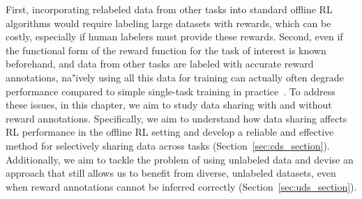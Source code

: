 \documentclass[../thesis.tex]{subfiles}
\begin{document}
First, incorporating relabeled data from other tasks into standard offline RL algorithms would require labeling large datasets with rewards, which can be costly, especially if human labelers must provide these rewards. Second, even if the functional form of the reward function for the task of interest is known beforehand, and data from other tasks are labeled with accurate reward annotations, na"{i}vely using all this data for training can actually often degrade performance compared to simple single-task training in practice~\citep{kalashnikov2021mt}. 
To address these issues, in this chapter, we aim to study data sharing with and without reward annotations. Specifically, we aim to understand how data sharing affects RL performance in the offline RL setting and develop a reliable and effective method for selectively sharing data across tasks (Section~\ref{sec:cds_section}). Additionally, we aim to tackle the problem of using unlabeled data and devise an approach that still allows us to benefit from diverse, unlabeled datasets, even when reward annotations cannot be inferred correctly (Section~\ref{sec:uds_section}).

\end{document}
